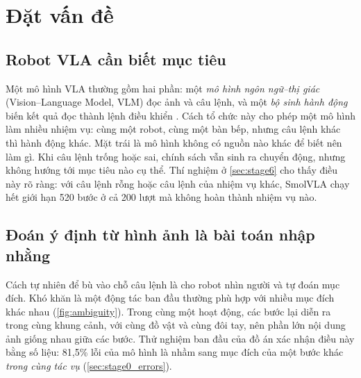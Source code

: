 \documentclass[a4paper,oneside]{report}
\begin{document}
\section{Đặt vấn đề}
\label{sec:datvande}

\subsection{Robot VLA cần biết mục tiêu}

Một mô hình VLA thường gồm hai phần: một \textit{mô hình ngôn ngữ--thị giác} (Vision--Language Model, VLM) đọc ảnh và câu lệnh, và một \textit{bộ sinh hành động} biến kết quả đọc thành lệnh điều khiển \citep{brohan2022rt1,zitkovich2023rt2,openx2024,black2024pi0}. Cách tổ chức này cho phép một mô hình làm nhiều nhiệm vụ: cùng một robot, cùng một bàn bếp, nhưng câu lệnh khác thì hành động khác. Mặt trái là mô hình không có nguồn nào khác để biết nên làm gì. Khi câu lệnh trống hoặc sai, chính sách vẫn sinh ra chuyển động, nhưng không hướng tới mục tiêu nào cụ thể. Thí nghiệm ở \cref{sec:stage6} cho thấy điều này rõ ràng: với câu lệnh rỗng hoặc câu lệnh của nhiệm vụ khác, SmolVLA chạy hết giới hạn 520 bước ở cả 200 lượt mà không hoàn thành nhiệm vụ nào.

\subsection{Đoán ý định từ hình ảnh là bài toán nhập nhằng}

Cách tự nhiên để bù vào chỗ câu lệnh là cho robot nhìn người và tự đoán mục đích. Khó khăn là một động tác ban đầu thường phù hợp với nhiều mục đích khác nhau (\cref{fig:ambiguity}). Trong cùng một hoạt động, các bước lại diễn ra trong cùng khung cảnh, với cùng đồ vật và cùng đôi tay, nên phần lớn nội dung ảnh giống nhau giữa các bước. Thử nghiệm ban đầu của đồ án xác nhận điều này bằng số liệu: 81,5\% lỗi của mô hình là nhầm sang mục đích của một bước khác \textit{trong cùng tác vụ} (\cref{sec:stage0_errors}).
\end{document}
